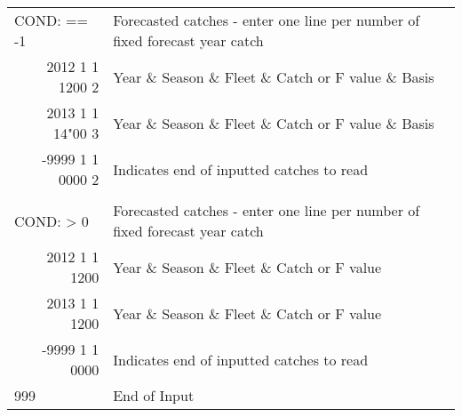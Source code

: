 \begin{landscape}
\begin{longtable}{p{3cm} p{7cm} p{11cm}}
  \hline
  \multicolumn{1}{l}{COND: == -1 }& \multicolumn{2}{l}{Forecasted catches - enter one line per number of fixed forecast year catch }\\
  \multicolumn{1}{r}{2012 1 1 1200 2}  & \multicolumn{2}{l}{Year \& Season \& Fleet \& Catch or F value \& Basis}  \\
  \multicolumn{1}{r}{2013 1 1 14"00 3}  & \multicolumn{2}{l}{Year \& Season \& Fleet \& Catch or F value \& Basis}  \\
  \multicolumn{1}{r}{-9999 1 1 0000 2}  & \multicolumn{2}{l}{Indicates end of inputted catches to read}  \\
  \\
  \multicolumn{1}{l}{COND: > 0 }& \multicolumn{2}{l}{Forecasted catches - enter one line per number of fixed forecast year catch }\\
  \multicolumn{1}{r}{2012  1 1 1200}  & \multicolumn{2}{l}{Year \& Season \& Fleet \& Catch or F value}  \\
  \multicolumn{1}{r}{2013  1 1 1200}  & \multicolumn{2}{l}{Year \& Season \& Fleet \& Catch or F value}  \\
  \multicolumn{1}{r}{-9999 1 1 0000}  & \multicolumn{2}{l}{Indicates end of inputted catches to read}  \\
  
  \hline
  999 & End of Input & \\

  \end{longtable}
\end{landscape}

\hypertarget{ForeSpawn}{}
